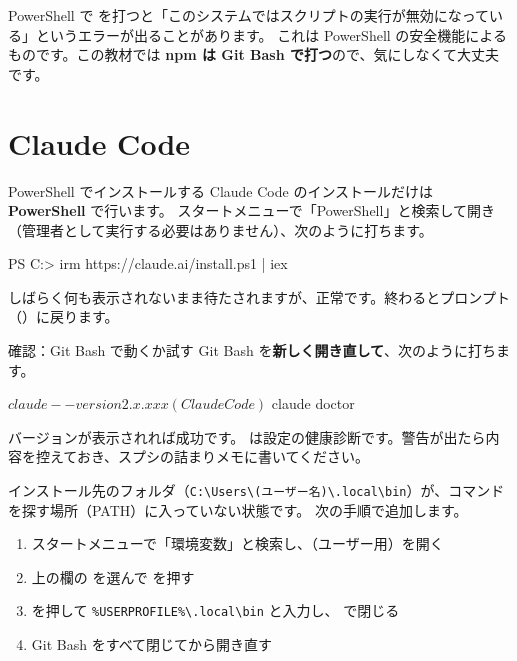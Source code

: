 \begin{tip}
PowerShell で  を打つと「このシステムではスクリプトの実行が無効になっている」というエラーが出ることがあります。
これは PowerShell の安全機能によるものです。この教材では \textbf{npm は Git Bash で打つ}ので、気にしなくて大丈夫です。
\end{tip}

\section{Claude Code}

\begin{step}{PowerShell でインストールする}
Claude Code のインストールだけは \textbf{PowerShell} で行います。
スタートメニューで「PowerShell」と検索して開き（管理者として実行する必要はありません）、次のように打ちます。
\begin{terminal}[PowerShell]
PS C:\Users\ryusei> irm https://claude.ai/install.ps1 | iex
\end{terminal}
しばらく何も表示されないまま待たされますが、正常です。終わるとプロンプト（）に戻ります。
\end{step}

\begin{step}{確認：Git Bash で動くか試す}
Git Bash を\textbf{新しく開き直して}、次のように打ちます。
\begin{terminal}
$ claude --version
2.x.xxx (Claude Code)
$ claude doctor
\end{terminal}
バージョンが表示されれば成功です。 は設定の健康診断です。警告が出たら内容を控えておき、スプシの詰まりメモに書いてください。
\end{step}

\begin{tip}
インストール先のフォルダ（\verb|C:\Users\(ユーザー名)\.local\bin|）が、コマンドを探す場所（PATH）に入っていない状態です。
次の手順で追加します。
\begin{enumerate}
  \item スタートメニューで「環境変数」と検索し、（ユーザー用）を開く
  \item 上の欄の  を選んで  を押す
  \item {} を押して \verb|%USERPROFILE%\.local\bin| と入力し、 で閉じる
  \item Git Bash をすべて閉じてから開き直す
\end{enumerate}
\end{tip}

